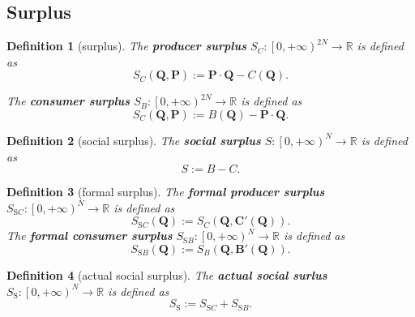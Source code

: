 \documentclass{article}
\newtheorem{definition}{Definition}[subsection]
\begin{document}
\subsection{Surplus}

\begin{definition}[surplus]
\label{multi surplus}
The \textbf{producer surplus} $S_C:\left[0,+\infty\right)^{2N}\to\mathbb R$ is defined as
$$S_C\!\left(\mathbf Q,\mathbf P\right):=\mathbf P\cdot\mathbf Q-C\!\left(\mathbf Q\right).$$

The \textbf{consumer surplus} $S_B:\left[0,+\infty\right)^{2N}\to\mathbb R$ is defined as
$$S_C\!\left(\mathbf Q,\mathbf P\right):=B\!\left(\mathbf Q\right)-\mathbf P\cdot\mathbf Q.$$
\end{definition}

\begin{definition}[social surplus]
\label{multi social surplus}
The \textbf{social surplus} $S:\left[0,+\infty\right)^N\to\mathbb R$ is defined as
$$S:=B-C.$$
\end{definition}

\begin{definition}[formal surplus]
\label{multi formal surplus}
The \textbf{formal producer surplus} $S_{\mathrm SC}:\left[0,+\infty\right)^N\to\mathbb R$ is defined as
$$S_{\mathrm SC}\!\left(\mathbf Q\right):=S_C\!\left(\mathbf Q,\mathbf C'\!\left(\mathbf Q\right)\right).$$
The \textbf{formal consumer surplus} $S_{\mathrm SB}:\left[0,+\infty\right)^N\to\mathbb R$ is defined as
$$S_{\mathrm SB}\!\left(\mathbf Q\right):=S_B\!\left(\mathbf Q,\mathbf B'\!\left(\mathbf Q\right)\right).$$
\end{definition}

\begin{definition}[actual social surplus]
\label{multi actual social surplus}
The \textbf{actual social surlus} $S_\mathrm S:\left[0,+\infty\right)^N\to\mathbb R$ is defined as
$$S_\mathrm S:=S_{\mathrm SC}+S_{\mathrm SB}.$$
\end{definition}
\end{document}

